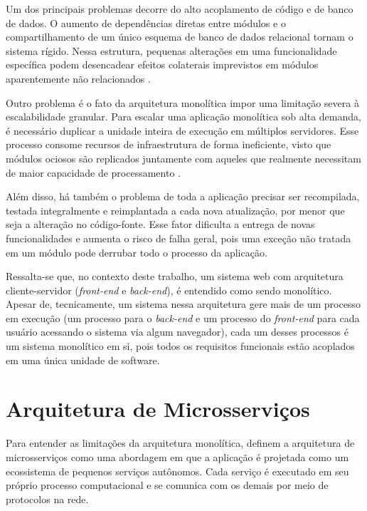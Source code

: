 Um dos principais problemas decorre do alto acoplamento de código e de banco de dados. O aumento de dependências diretas entre módulos e o compartilhamento de um único esquema de banco de dados relacional tornam o sistema rígido. Nessa estrutura, pequenas alterações em uma funcionalidade específica podem desencadear efeitos colaterais imprevistos em módulos aparentemente não relacionados \cite{richardson2018}.

Outro problema é o fato da arquitetura monolítica impor uma limitação severa à escalabilidade granular. Para escalar uma aplicação monolítica sob alta demanda, é necessário duplicar a unidade inteira de execução em múltiplos servidores. Esse processo consome recursos de infraestrutura de forma ineficiente, visto que módulos ociosos são replicados juntamente com aqueles que realmente necessitam de maior capacidade de processamento \cite{lewis2014}.

Além disso, há também o problema de toda a aplicação precisar ser recompilada, testada integralmente e reimplantada a cada nova atualização, por menor que seja a alteração no código-fonte. Esse fator dificulta a entrega de novas funcionalidades e aumenta o risco de falha geral, pois uma exceção não tratada em um módulo pode derrubar todo o processo da aplicação.

Ressalta-se que, no contexto deste trabalho, um sistema web com arquitetura cliente-servidor (\textit{front-end} e \textit{back-end}), é entendido como sendo monolítico. Apesar de, tecnicamente, um sistema nessa arquitetura gere mais de um processo em execução (um processo para o \textit{back-end} e um processo do \textit{front-end} para cada usuário acessando o sistema via algum navegador), cada um desses processos é um sistema monolítico em si, pois todos os requisitos funcionais estão acoplados em uma única unidade de software.

\section{Arquitetura de Microsserviços}

Para entender as limitações da arquitetura monolítica, \textcite{lewis2014} definem a arquitetura de microsserviços como uma abordagem em que a aplicação é projetada como um ecossistema de pequenos serviços autônomos. Cada serviço é executado em seu próprio processo computacional e se comunica com os demais por meio de protocolos na rede.

